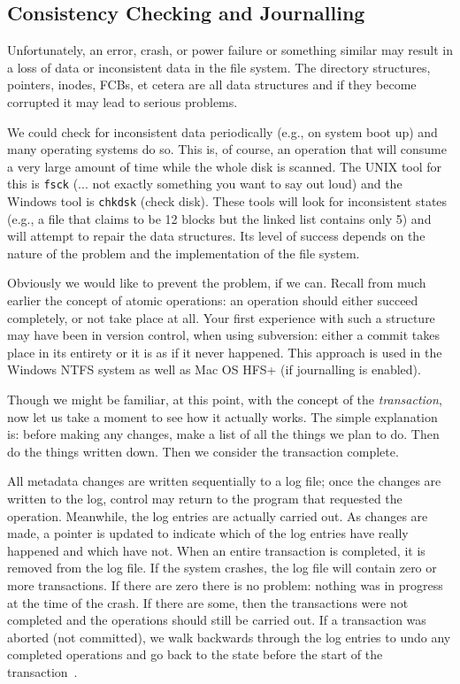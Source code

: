 \subsection*{Consistency Checking and Journalling}

Unfortunately, an error, crash, or power failure or something similar may result in a loss of data or inconsistent data in the file system. The directory structures, pointers, inodes, FCBs, et cetera are all data structures and if they become corrupted it may lead to serious problems.

We could check for inconsistent data periodically (e.g., on system boot up) and many operating systems do so. This is, of course, an operation that will consume a very large amount of time while the whole disk is scanned. The UNIX tool for this is \texttt{fsck} (... not exactly something you want to say out loud) and the Windows tool is \texttt{chkdsk} (check disk). These tools will look for inconsistent states (e.g., a file that claims to be 12 blocks but the linked list contains only 5) and will attempt to repair the data structures. Its level of success depends on the nature of the problem and the implementation of the file system.

Obviously we would like to prevent the problem, if we can. Recall from much earlier the concept of atomic operations: an operation should either succeed completely, or not take place at all. Your first experience with such a structure may have been in version control, when using subversion: either a commit takes place in its entirety or it is as if it never happened. This approach is used in the Windows NTFS system as well as Mac OS HFS+ (if journalling is enabled). 

Though we might be familiar, at this point, with the concept of the \textit{transaction}, now let us take a moment to see how it actually works. The simple explanation is: before making any changes, make a list of all the things we plan to do. Then do the things written down. Then we consider the transaction complete.

All metadata changes are written sequentially to a log file; once the changes are written to the log, control may return to the program that requested the operation. Meanwhile, the log entries are actually carried out. As changes are made, a pointer is updated to indicate which of the log entries have really happened and which have not. When an entire transaction is completed, it is removed from the log file. If the system crashes, the log file will contain zero or more transactions. If there are zero there is no problem: nothing was in progress at the time of the crash. If there are some, then the transactions were not completed and the operations should still be carried out. If a transaction was aborted (not committed), we walk backwards through the log entries to undo any completed operations and go back to the state before the start of the transaction~\cite{osc}.

